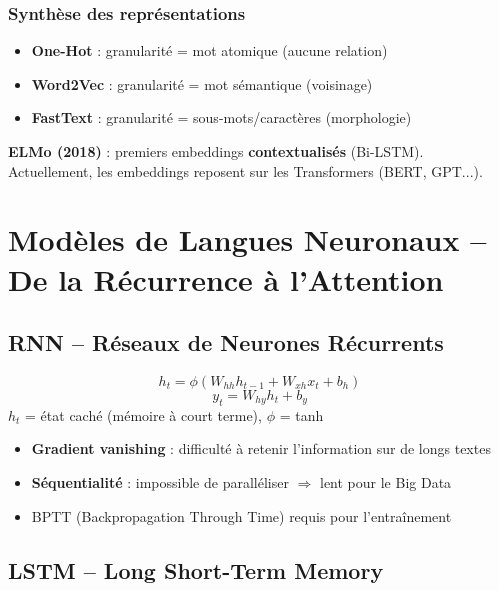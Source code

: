 \documentclass[a4paper,10pt]{article}
\begin{document}
\subsubsection{Synthèse des représentations}
\begin{itemize}
  \item \textbf{One-Hot} : granularité = mot atomique (aucune relation)
  \item \textbf{Word2Vec} : granularité = mot sémantique (voisinage)
  \item \textbf{FastText} : granularité = sous-mots/caractères (morphologie)
\end{itemize}

\textbf{ELMo (2018)} : premiers embeddings \textbf{contextualisés} (Bi-LSTM). Actuellement, les embeddings reposent sur les Transformers (BERT, GPT...).

\section{Modèles de Langues Neuronaux -- De la Récurrence à l'Attention}

\subsection{RNN -- Réseaux de Neurones Récurrents}

\begin{formulebox}
\[
h_t = \phi(W_{hh} h_{t-1} + W_{xh} x_t + b_h)
\]
\[
y_t = W_{hy} h_t + b_y
\]
$h_t$ = état caché (mémoire à court terme), $\phi$ = tanh
\end{formulebox}

\begin{warningbox}
\begin{itemize}
  \item \textbf{Gradient vanishing} : difficulté à retenir l'information sur de longs textes
  \item \textbf{Séquentialité} : impossible de paralléliser $\Rightarrow$ lent pour le Big Data
  \item BPTT (Backpropagation Through Time) requis pour l'entraînement
\end{itemize}
\end{warningbox}

\subsection{LSTM -- Long Short-Term Memory}
\end{document}
